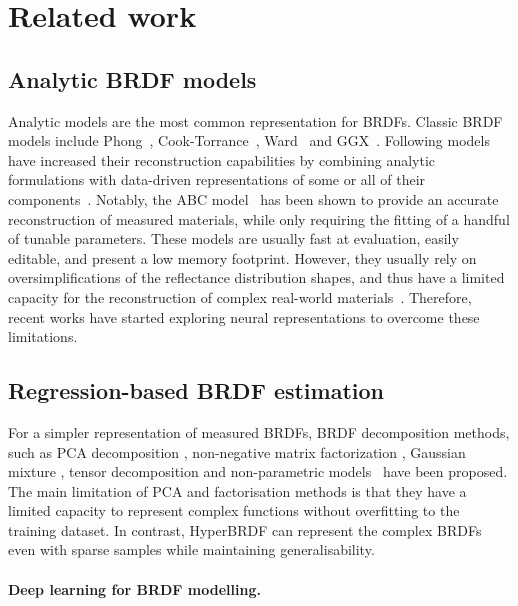 \section{Related work}
\label{sec:relatedwork}


\subsection{Analytic BRDF models}
\label{hyperbrdf-RW}
Analytic models are the most common representation for \gls{BRDF}s. Classic \gls{BRDF} models include Phong~\cite{blinn77}, Cook-Torrance~\cite{cooktorrance1982}, Ward~\cite{ward1992} and GGX~\cite{walter2007microfacet}. Following models have increased their reconstruction capabilities by combining analytic formulations with data-driven representations of some or all of their components~\cite{dupuy2015, ashikhmin2007, bagher2016}. Notably, the ABC model~\cite{low2012} has been shown to provide an accurate reconstruction of measured materials, while only requiring the fitting of a handful of tunable parameters. These models are usually fast at evaluation, easily editable, and present a low memory footprint. However, they usually rely on oversimplifications of the reflectance distribution shapes, and thus have a limited capacity for the reconstruction of complex real-world materials~\cite{ngan2005, guarnera2016}. Therefore, recent works have started exploring neural representations to overcome these limitations.



\subsection{Regression-based BRDF estimation}
For a simpler representation of measured \gls{BRDF}s, \gls{BRDF} decomposition methods, such as PCA decomposition 
\cite{matusik2003data, nielsen2015optimal, serrano2018intuitive}, non-negative matrix factorization \cite{lawrence2004efficient, lawrence2006inverse}, Gaussian mixture \cite{sun2007interactive}, tensor decomposition \cite{bilgili2011general, tongbuasirilai2020compact} 
and non-parametric models~\cite{bagher2016non} have been proposed. The main limitation of PCA and factorisation methods is  that they have a limited capacity to represent complex functions without overfitting to the training dataset. In contrast, HyperBRDF can represent the complex \gls{BRDF}s even with sparse samples while maintaining generalisability.


\paragraph{Deep learning for BRDF modelling.}

